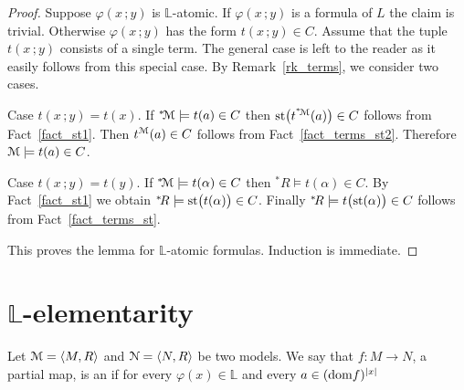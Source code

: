 \documentclass[11pt,oneside]{amsart}
\renewcommand*{\emph}[1]{%
   \smash{\tikz[baseline]\node[rectangle, fill=teal!25, rounded corners, inner xsep=0.5ex, inner ysep=0.2ex, anchor=base, minimum height = 2.7ex]{#1};}}
\begin{document}
\begin{proof}
  Suppose $\varphi(x\,;y)$ is $\mathds{L}$-atomic.
  If $\varphi(x\,;y)$ is a formula of $L$ the claim is trivial. 
  Otherwise $\varphi(x\,;y)$ has the form $t(x\,;y)\in C$.
  Assume that the tuple $t(x\,;y)$ consists of a single term.
  The general case is left to the reader as it easily follows from this special case. 
  By Remark~\ref{rk_terms}, we consider two cases.

  Case $t(x\,;y)=t(x)$.  
  If ${}^*{\!\EuScript M}\models t(a)\in C$ then ${\rm st}\big(t^{{}^*{\!\EuScript M}}(a)\big)\in C$ follows from Fact~\ref{fact_st1}.
  Then $t^{\EuScript M}(a)\in C$ follows from Fact~\ref{fact_terms_st2}.
  Therefore ${\EuScript M}\models t(a)\in C$.

  Case $t(x\,;y)=t(y)$.  
  If ${}^*{\!\EuScript M}\models t(\alpha)\in C$ then ${}^*\!R\models t(\alpha)\in C$.
  By Fact~\ref{fact_st1} we obtain ${}^*\!R\models {\rm st}\big(t(\alpha)\big)\in C$.
  Finally ${}^*\!R\models t\big({\rm st}(\alpha)\big)\in C$ follows from Fact~\ref{fact_terms_st}.



  
  This proves the lemma for $\mathds{L}$-atomic formulas.
  Induction is immediate. 
\end{proof}

\section{$\mathds{L}$-elementarity}

\def\ceq#1#2#3{\parbox[t]{35ex}{$\displaystyle #1$}\parbox{5ex}{\hfil $#2$}{$\displaystyle #3$}}

Let ${\EuScript M}=\langle M,R\rangle$ and ${\EuScript N}=\langle N,R\rangle$ be two models.
We say that $f:M\to N$, a partial map, is an \emph{$\mathds{L}$-elementary map\/} if for every $\varphi(x)\in\mathds{L}$ and every $a\in({\rm dom }f)^{|x|}$
\end{document}

